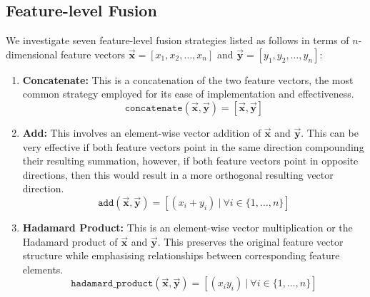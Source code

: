 \documentclass{mpaper}
\begin{document}
\subsection{Feature-level Fusion}
We investigate seven feature-level fusion strategies listed as follows in terms of $n$-dimensional feature vectors $\bm{\vec{x}} = [x_1, x_2, \ldots, x_n]$ and $\bm{\vec{y}} = [y_1, y_2, \ldots, y_n]$:
\vspace{-0.1cm}
\begin{enumerate}
    \itemsep0em
    \item \textbf{Concatenate:} This is a concatenation of the two feature vectors, the most common strategy employed for its ease of implementation and effectiveness.
    $$\mathtt{concatenate}(\bm{\vec{x}}, \bm{\vec{y}}) = [\bm{\vec{x}}, \bm{\vec{y}}]$$

    \item \textbf{Add:} This involves an element-wise vector addition of $\bm{\vec{x}}$ and $\bm{\vec{y}}$. This can be very effective if both feature vectors point in the same direction compounding their resulting summation, however, if both feature vectors point in opposite directions, then this would result in a more orthogonal resulting vector direction.
    $$\mathtt{add}(\bm{\vec{x}}, \bm{\vec{y}}) = \left[(x_i + y_i) \ | \ \forall i \in \{1, \ldots, n\}\right]$$
    
    \item \textbf{Hadamard Product:} This is an element-wise vector multiplication or the Hadamard product of $\bm{\vec{x}}$ and $\bm{\vec{y}}$. This preserves the original feature vector structure while emphasising relationships between corresponding feature elements.
    $$\mathtt{hadamard\_product}(\bm{\vec{x}}, \bm{\vec{y}}) = \left[(x_iy_i) \ | \ \forall i \in \{1, \ldots, n\}\right]$$
    

\end{enumerate}
\end{document}
